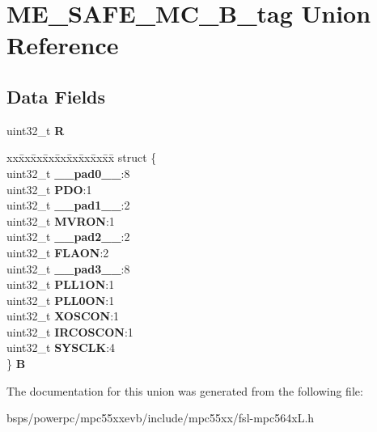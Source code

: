 \hypertarget{unionME__SAFE__MC__32B__tag}{}\section{M\+E\+\_\+\+S\+A\+F\+E\+\_\+\+M\+C\+\_\+B\+\_\+tag Union Reference}
\label{unionME__SAFE__MC__32B__tag}
\subsection*{Data Fields}
\begin{DoxyCompactItemize}
\item 
\mbox{\label{unionME__SAFE__MC__32B__tag_a1c417a84a217c19477141d4aa03a45eb}} 
uint32\+\_\+t {\bfseries R}
\item 
\mbox{\label{unionME__SAFE__MC__32B__tag_a23d222805e41819e447a2554eb328c6b}} 
\begin{tabbing}
xx\=xx\=xx\=xx\=xx\=xx\=xx\=xx\=xx\=\kill
struct \{\\
\>uint32\_t {\bfseries \_\_pad0\_\_}:8\\
\>uint32\_t {\bfseries PDO}:1\\
\>uint32\_t {\bfseries \_\_pad1\_\_}:2\\
\>uint32\_t {\bfseries MVRON}:1\\
\>uint32\_t {\bfseries \_\_pad2\_\_}:2\\
\>uint32\_t {\bfseries FLAON}:2\\
\>uint32\_t {\bfseries \_\_pad3\_\_}:8\\
\>uint32\_t {\bfseries PLL1ON}:1\\
\>uint32\_t {\bfseries PLL0ON}:1\\
\>uint32\_t {\bfseries XOSCON}:1\\
\>uint32\_t {\bfseries IRCOSCON}:1\\
\>uint32\_t {\bfseries SYSCLK}:4\\
\} {\bfseries B}\\

\end{tabbing}\end{DoxyCompactItemize}


The documentation for this union was generated from the following file\+:\begin{DoxyCompactItemize}
\item 
bsps/powerpc/mpc55xxevb/include/mpc55xx/fsl-\/mpc564x\+L.\+h\end{DoxyCompactItemize}
